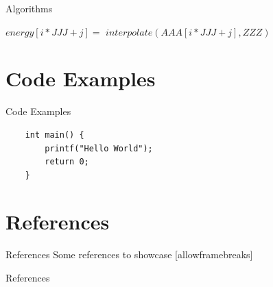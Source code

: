 \documentclass[bigger,pdf]{beamer}
\begin{document}
\begin{frame}{Algorithms}
\begin{algorithm}[H]
\begin{algorithmic}[1]
\STATE $energy[i*JJJ+j] =$ 
$ interpolate(AAA[i*JJJ+j], ZZZ)$
\ENDFOR
\ENDFOR
\end{algorithmic}
\caption{pseudocode for the calculation of }
\label{alg:seq}
\end{algorithm}
\end{frame}

\section{Code Examples}

\begin{frame}[fragile]{Code Examples}

\begin{verbatim}
    int main() {
        printf("Hello World");
        return 0;
    }
\end{verbatim}

\end{frame}

\section{References}

\begin{frame}{References}
  Some references to showcase [allowframebreaks] \cite{knuth92,ConcreteMath,Simpson,Er01,greenwade93}
\end{frame}

\begin{frame}[allowframebreaks]{References}

  
  

\end{frame}
\end{document}
